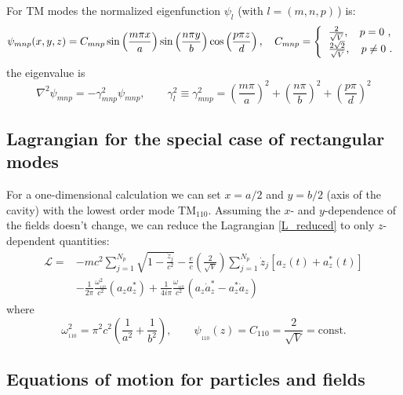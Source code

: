 \documentclass[11pt]{article}
\newcommand{\LL}{\mathcal{L}}
\begin{document}
For TM modes the normalized eigenfunction $\psi_l$ (with $l=(m,n,p)$\,) is:
%
\begin{equation}
\psi_{mnp}(x,y,z) = C_{mnp}\sin\left(\frac{m\pi x}{a}\right) \sin\left(\frac{n\pi y}{b}\right) 
\cos\left(\frac{p\pi z}{d}\right), \quad 
C_{mnp} = \left\{
\begin{tabular}{l}
$\frac{2}{\sqrt{V}}, \quad p = 0$ , \\
$\frac{2\sqrt{2}}{\sqrt{V}}, \quad p\ne 0$ .
\end{tabular}
\right.
\label{psi_rectangular_TM}
\end{equation}
%
the eigenvalue is
%
\begin{equation}
\nabla^2\psi_{mnp} = -\gamma_{mnp}^2\psi_{mnp}, \qquad
\gamma_l^2\equiv \gamma_{mnp}^2 = \left(\frac{m\pi}{a} \right)^2 + \left(\frac{n\pi}{b} \right)^2
+ \left(\frac{p\pi}{d} \right)^2
\label{eigenvakue_rectangular_TM}
\end{equation}
%

\subsection{Lagrangian for the special case of rectangular modes}
\label{L_rectangular_TM}

For a one-dimensional calculation we can set $x=a/2$ and $y=b/2$ (axis of the cavity) with the lowest order mode
 TM$_{110}$. Assuming the $x$- and $y$-dependence of the fields doesn't change, we can reduce the Lagrangian
\eqref{L_reduced} to only $z$-dependent quantities:
%
\begin{align}
\LL =& -mc^2\sum_{j=1}^{N_p}\sqrt{1-\frac{\dot{{z}}_j} {c^2}} 
- \frac{e}{c} \left(\frac{2}{\sqrt{V}}\right)
\sum_{j=1}^{N_p} \dot{z}_j \left[a_z(t) + a_z^*(t)  \right] \nonumber\\
& - \frac{1}{2\pi} \frac{\omega_{_{110}}^2}{c^2}\left( {a}_z {a}_z^*\right) 
+ \frac{1}{4i\pi} \frac{\omega_{_{110}}}{c^2}\left( {a}_z {\dot{{a}}}_z^* - {a}_z^*{\dot{{a}}}_z \right)
\label{L_z}
\end{align}
%
where
%
\begin{equation}
\omega_{_{110}}^2 = \pi^2 c^2 \left( \frac{1}{a^2} + \frac{1}{b^2} \right), \qquad
\psi_{_{110}}(z) = C_{110} = \frac{2}{\sqrt{V}} = \mbox{const}.
\end{equation}

\subsection{Equations of motion for particles and fields}
\label{EOM}
\end{document}
